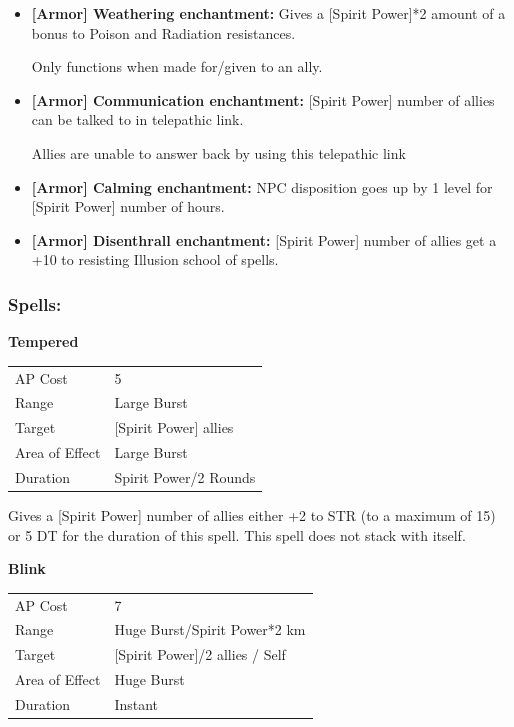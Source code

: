 \documentclass[11pt,a4paper,twocolumn]{book}
\begin{document}
\begin{itemize}
\item \textbf{ [Armor] Weathering enchantment:} Gives a [Spirit Power]*2 amount of a bonus to Poison and Radiation resistances.

Only functions when made for/given to an ally.

\item \textbf{ [Armor] Communication enchantment:} [Spirit Power] number of allies can be talked to in telepathic link.

Allies are unable to answer back by using this telepathic link

\item \textbf{ [Armor] Calming enchantment:} NPC disposition goes up by 1 level for [Spirit Power] number of hours.
\item \textbf{ [Armor] Disenthrall enchantment:} [Spirit Power] number of allies get a +10 to resisting Illusion school of spells.
\end{itemize}

\vfill

\subsubsection*{Spells:}

\smallskip
\noindent
\textbf{Tempered}

\smallskip
{
	\begin{tabu} to 70mm{| X[l,4] | X[l,7] |}
		\hline
        AP Cost	      	& 5 						\\
        Range     		& Large Burst				\\
        Target      	& [Spirit Power] allies		\\
        Area of Effect  & Large Burst  	 			\\
        Duration     	& Spirit Power/2 Rounds		\\ \hline
	\end{tabu}
		
}
\smallskip

Gives a [Spirit Power] number of allies either +2 to STR (to a maximum of 15) or 5 DT for the duration of this spell. This spell does not stack with itself.

\bigskip
\noindent
\textbf{Blink}

\smallskip
{
	\begin{tabu} to 70mm{| X[l,4] | X[l,7] |}
		\hline
        AP Cost	      	& 7 								\\
        Range     		& Huge Burst/Spirit Power*2 km		\\
        Target      	& [Spirit Power]/2 allies / Self		\\
        Area of Effect  & Huge Burst  						 \\
        Duration     	& Instant							\\ \hline
	\end{tabu}
		
}
\smallskip
\end{document}
